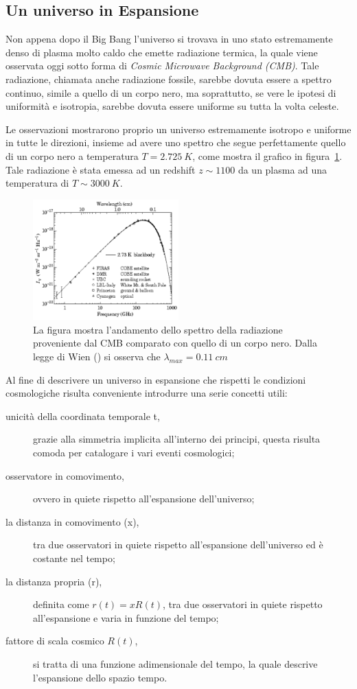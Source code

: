 \subsection{Un universo in Espansione}\label{sec:unverso-espansione}
Non appena dopo il Big Bang l'universo si trovava in uno stato estremamente denso di plasma molto caldo che emette radiazione termica, la quale viene osservata oggi sotto forma di \textit{Cosmic Microwave Background (CMB)}. Tale radiazione, chiamata anche radiazione fossile, sarebbe dovuta essere a spettro continuo, simile a quello di un corpo nero, ma soprattutto, se vere le ipotesi di uniformità e isotropia, sarebbe dovuta essere uniforme su tutta la volta celeste. 

Le osservazioni mostrarono proprio un universo estremamente isotropo e uniforme in tutte le direzioni, insieme ad avere uno spettro che segue perfettamente quello di un corpo nero a temperatura $T = \SI{2.725}{K}$, come mostra il grafico in figura~\ref{fig:balckbody-universe}. Tale radiazione è stata emessa ad un redshift $z \sim 1100$ da un plasma ad una temperatura di $T \sim \SI{3000}{K}$.
\begin{figure}
    \centering
    \includegraphics[width = 0.5\textwidth]{immagini/blackbody-universe.png}
    \caption{La figura mostra l'andamento dello spettro della radiazione proveniente dal CMB comparato con quello di un corpo nero. Dalla legge di Wien () si osserva che $\lambda_{max}= \SI{0.11}{cm}$}\label{fig:balckbody-universe}
\end{figure}

Al fine di descrivere un universo in espansione che rispetti le condizioni cosmologiche risulta conveniente introdurre una serie concetti utili:
\begin{description}
    \item[unicità della coordinata temporale t,] grazie alla simmetria implicita all'interno dei principi, questa risulta comoda per catalogare i vari eventi cosmologici;
    \item[osservatore in comovimento,] ovvero in quiete rispetto all'espansione dell'universo;
    \item[la distanza in comovimento (x),] tra due osservatori in quiete rispetto all'espansione dell'universo ed è costante nel tempo;
    \item[la distanza propria (r),] definita come $r(t) = x R(t)$, tra due osservatori in quiete rispetto all'espansione e varia in funzione del tempo;
    \item[fattore di scala cosmico $R(t)$,] si tratta di una funzione adimensionale del tempo, la quale descrive l'espansione dello spazio tempo.
\end{description}

